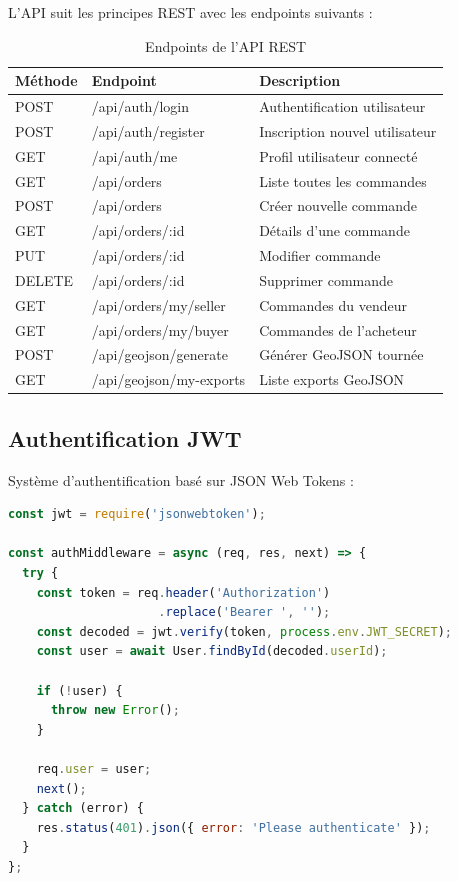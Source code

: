 \documentclass[12pt,a4paper]{report}
\begin{document}
L'API suit les principes REST avec les endpoints suivants :

\begin{table}[H]
\centering
\small
\begin{tabular}{|l|l|p{5cm}|}
\hline
\textbf{Méthode} & \textbf{Endpoint} & \textbf{Description} \\
\hline
POST & /api/auth/login & Authentification utilisateur \\
POST & /api/auth/register & Inscription nouvel utilisateur \\
GET & /api/auth/me & Profil utilisateur connecté \\
\hline
GET & /api/orders & Liste toutes les commandes \\
POST & /api/orders & Créer nouvelle commande \\
GET & /api/orders/:id & Détails d'une commande \\
PUT & /api/orders/:id & Modifier commande \\
DELETE & /api/orders/:id & Supprimer commande \\
GET & /api/orders/my/seller & Commandes du vendeur \\
GET & /api/orders/my/buyer & Commandes de l'acheteur \\
\hline
POST & /api/geojson/generate & Générer GeoJSON tournée \\
GET & /api/geojson/my-exports & Liste exports GeoJSON \\
\hline
\end{tabular}
\caption{Endpoints de l'API REST}
\end{table}

\subsection{Authentification JWT}

Système d'authentification basé sur JSON Web Tokens :

\begin{lstlisting}[language=JavaScript, caption=Middleware d'authentification]
const jwt = require('jsonwebtoken');

const authMiddleware = async (req, res, next) => {
  try {
    const token = req.header('Authorization')
                     .replace('Bearer ', '');
    const decoded = jwt.verify(token, process.env.JWT_SECRET);
    const user = await User.findById(decoded.userId);

    if (!user) {
      throw new Error();
    }

    req.user = user;
    next();
  } catch (error) {
    res.status(401).json({ error: 'Please authenticate' });
  }
};
\end{lstlisting}
\end{document}
